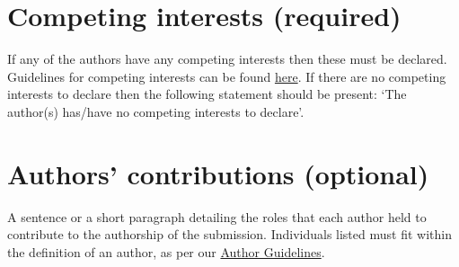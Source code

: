 \documentclass[times,linguex]{glossa}
\begin{document}
\section*{Competing interests (required)}

If any of the authors have any competing interests then these must be declared. Guidelines for competing interests can be found \href{https://www.glossa-journal.org/site/competing-interests/}{here}. If there are no competing interests to declare then the following statement should be present: `The author(s) has/have no competing interests to declare'.

\section*{Authors' contributions (optional)}\label{contrib}

A sentence or a short paragraph detailing the roles that each author held to contribute to the authorship of the submission.  Individuals listed must fit within the definition of an author, as per our \href{https://www.glossa-journal.org/site/author-guidelines/}{Author Guidelines}.

\nocite{*} %

\end{document}
